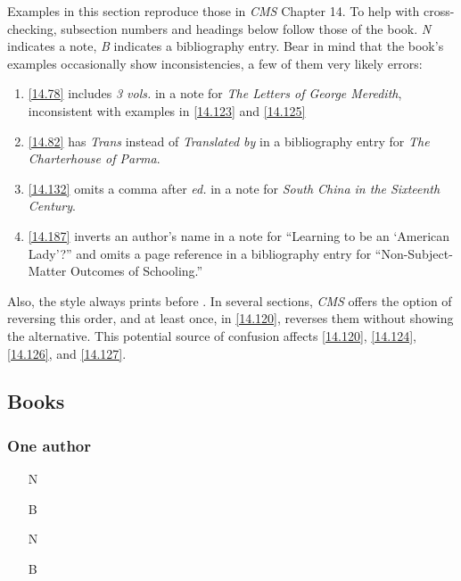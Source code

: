 \documentclass[11pt,letterpaper,oneside]{article}
\begin{document}
Examples in this section reproduce those in \textit{CMS} Chapter 14.
To help with cross-checking, subsection numbers and headings below
follow those of the book. \textit{N} indicates a note, \textit{B}
indicates a bibliography entry. Bear in mind that the book's examples
occasionally show inconsistencies, a few of them very likely errors:

\begin{enumerate} \item \ref{14.78} includes \textit{3 vols.} in a
note for \textit{The Letters of George Meredith}, inconsistent with
examples in \ref{14.123} and \ref{14.125}

\item \ref{14.82} has \textit{Trans} instead of \textit{Translated by}
in a bibliography entry for \textit{The Charterhouse of Parma}.

\item \ref{14.132} omits a comma after \textit{ed.} in a note for
\textit{South China in the Sixteenth Century}.

\item \ref{14.187} inverts an author's name in a note for ``Learning
to be an `American Lady'?'' and omits a page reference in a
bibliography entry for ``Non-Subject-Matter Outcomes of Schooling.''
\end{enumerate}

\noindent Also, the style always prints  before
. In several sections, \textit{CMS} offers the
option of reversing this order, and at least once, in \ref{14.120},
reverses them without showing the alternative. This potential source
of confusion affects \ref{14.120}, \ref{14.124}, \ref{14.126}, and
\ref{14.127}.

\subsection{Books}
\setcounter{subsection}{14}

\setcounter{subsubsection}{74}
\subsubsection{One author}

\begin{itemize}
\item[N] 

\item[B] 

\item[N] 

\item[B] 
\end{itemize}
\end{document}
